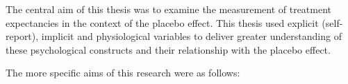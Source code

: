 



The central aim of this thesis was to examine the measurement of
treatment expectancies in the context of the placebo effect. This
thesis used explicit (self-report), implicit and physiological
variables to deliver greater understanding of these psychological
constructs and their relationship with the placebo effect.

The more specific aims of this research were as follows:


